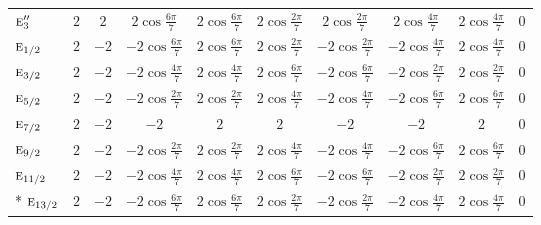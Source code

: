 \documentclass[10pt,a4paper]{article}
\makeatletter
\def\grouprule#1#2{\noalign{\marks\LTgroupmarks{\the\belowrulesep}\nobreak\vskip#1%
  \vskip\aboverulesep}\multispan\LT@cols\unskip{\leaders\hrule\@height#2\hfill\kern\z@}\cr
  \noalign{\penalty\LTrulebreak\vskip\belowrulesep\global\@lastruleclass\z@}}
\numberwithin{equation}{section}
\newcommand{\irr}[1]{\text{\normalfont\scshape #1}}
\makeatother
\begin{document}
{{\begin{longtable}{@{}lccccccccc@{}}
$\irr{e}_{3}''$ & $2$ & $2$ & $2\cos\tfrac{6\pi}{7}$ & $2\cos\tfrac{6\pi}{7}$ & $2\cos\tfrac{2\pi}{7}$ & $2\cos\tfrac{2\pi}{7}$ & $2\cos\tfrac{4\pi}{7}$ & $2\cos\tfrac{4\pi}{7}$ & $0$\\
\grouprule{0pt}{\lightrulewidth}
$\irr{e}_{1/2}$ & $2$ & $-2$ & $-2\cos\tfrac{6\pi}{7}$ & $2\cos\tfrac{6\pi}{7}$ & $2\cos\tfrac{2\pi}{7}$ & $-2\cos\tfrac{2\pi}{7}$ & $-2\cos\tfrac{4\pi}{7}$ & $2\cos\tfrac{4\pi}{7}$ & $0$\\
$\irr{e}_{3/2}$ & $2$ & $-2$ & $-2\cos\tfrac{4\pi}{7}$ & $2\cos\tfrac{4\pi}{7}$ & $2\cos\tfrac{6\pi}{7}$ & $-2\cos\tfrac{6\pi}{7}$ & $-2\cos\tfrac{2\pi}{7}$ & $2\cos\tfrac{2\pi}{7}$ & $0$\\
$\irr{e}_{5/2}$ & $2$ & $-2$ & $-2\cos\tfrac{2\pi}{7}$ & $2\cos\tfrac{2\pi}{7}$ & $2\cos\tfrac{4\pi}{7}$ & $-2\cos\tfrac{4\pi}{7}$ & $-2\cos\tfrac{6\pi}{7}$ & $2\cos\tfrac{6\pi}{7}$ & $0$\\
$\irr{e}_{7/2}$ & $2$ & $-2$ & $-2$ & $2$ & $2$ & $-2$ & $-2$ & $2$ & $0$\\
$\irr{e}_{9/2}$ & $2$ & $-2$ & $-2\cos\tfrac{2\pi}{7}$ & $2\cos\tfrac{2\pi}{7}$ & $2\cos\tfrac{4\pi}{7}$ & $-2\cos\tfrac{4\pi}{7}$ & $-2\cos\tfrac{6\pi}{7}$ & $2\cos\tfrac{6\pi}{7}$ & $0$\\
$\irr{e}_{11/2}$ & $2$ & $-2$ & $-2\cos\tfrac{4\pi}{7}$ & $2\cos\tfrac{4\pi}{7}$ & $2\cos\tfrac{6\pi}{7}$ & $-2\cos\tfrac{6\pi}{7}$ & $-2\cos\tfrac{2\pi}{7}$ & $2\cos\tfrac{2\pi}{7}$ & $0$\\*
$\irr{e}_{13/2}$ & $2$ & $-2$ & $-2\cos\tfrac{6\pi}{7}$ & $2\cos\tfrac{6\pi}{7}$ & $2\cos\tfrac{2\pi}{7}$ & $-2\cos\tfrac{2\pi}{7}$ & $-2\cos\tfrac{4\pi}{7}$ & $2\cos\tfrac{4\pi}{7}$ & $0$\\
\bottomrule\end{longtable}}}
\end{document}
